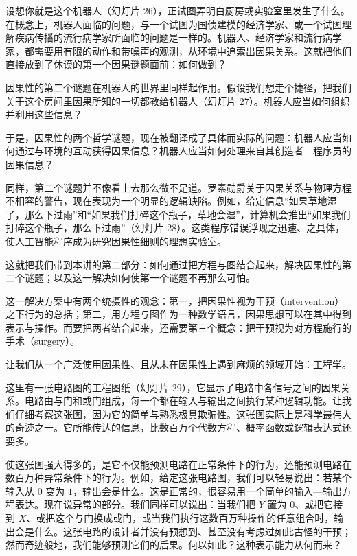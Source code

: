 设想你就是这个机器人（幻灯片 26），正试图弄明白厨房或实验室里发生了什么。在概念上，机器人面临的问题，与一个试图为国债建模的经济学家、或一个试图理解疾病传播的流行病学家所面临的问题是一样的。机器人、经济学家和流行病学家，都需要用有限的动作和带噪声的观测，从环境中追索出因果关系。这就把他们直接放到了休谟的第一个因果谜题面前：如何做到？

因果性的第二个谜题在机器人的世界里同样起作用。假设我们想走个捷径，把我们关于这个房间里因果所知的一切都教给机器人（幻灯片 27）。机器人应当如何组织并利用这些信息？

于是，因果性的两个哲学谜题，现在被翻译成了具体而实际的问题：机器人应当如何通过与环境的互动获得因果信息？机器人应当如何处理来自其创造者—程序员的因果信息？

同样，第二个谜题并不像看上去那么微不足道。罗素勋爵关于因果关系与物理方程不相容的警告，现在表现为一个明显的逻辑缺陷。例如，给定信息“如果草地湿了，那么下过雨”和“如果我们打碎这个瓶子，草地会湿”，计算机会推出“如果我们打碎这个瓶子，那么下过雨”（幻灯片 28）。这类程序错误浮现之迅速、之具体，使人工智能程序成为研究因果性细则的理想实验室。

这就把我们带到本讲的第二部分：如何通过把方程与图结合起来，解决因果性的第二个谜题；以及这一解决如何使第一个谜题不再那么可怕。

这一解决方案中有两个统摄性的观念：第一，把因果性视为干预（intervention）之下行为的总括；第二，用方程与图作为一种数学语言，因果思想可以在其中得到表示与操作。而要把两者结合起来，还需要第三个概念：把干预视为对方程施行的手术（surgery）。

让我们从一个广泛使用因果性、且从未在因果性上遇到麻烦的领域开始：工程学。

这里有一张电路图的工程图纸（幻灯片 29），它显示了电路中各信号之间的因果关系。电路由与门和或门组成，每一个都在输入与输出之间执行某种逻辑功能。让我们仔细考察这张图，因为它的简单与熟悉极具欺骗性。这张图实际上是科学最伟大的奇迹之一。它所能传达的信息，比数百万个代数方程、概率函数或逻辑表达式还要多。

\begin{center}
\end{center}

使这张图强大得多的，是它不仅能预测电路在正常条件下的行为，还能预测电路在数百万种异常条件下的行为。例如，给定这张电路图，我们可以轻易说出：若某个输入从 $0$ 变为 $1$，输出会是什么。这是正常的，很容易用一个简单的输入—输出方程表达。现在说异常的部分。我们同样可以说出：当我们把 $Y$ 置为 $0$、或把它接到 $X$、或把这个与门换成或门，或当我们执行这数百万种操作的任意组合时，输出会是什么。这张电路的设计者并没有预想到、甚至没有考虑过如此古怪的干预；然而奇迹般地，我们能够预测它们的后果。何以如此？这种表示能力从何而来？

